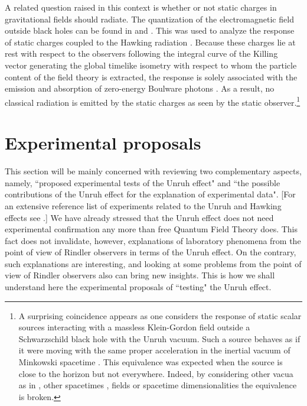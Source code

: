 \documentclass[12pt,nofootinbib,floatfix,aps,prd,showpacs,amsmath,amssymb,eqsecnum]{revtex4-2}
\begin{document}
A related question raised in this context is whether or not static
charges in gravitational fields should radiate. The quantization of the 
electromagnetic field outside black holes can be found 
in \textcite{Cognolaetal98} and \textcite{Crispinoetal01}. This was used to analyze 
the response of static charges coupled to the Hawking radiation
\cite{Crispinoetal98}. Because these charges lie at rest with respect
to the observers following the integral curve of the Killing vector
generating the global timelike isometry with 
respect to whom the particle content of the field theory is extracted,
the response is solely associated with the emission and absorption 
of zero-energy Boulware photons \cite{Boulware75,Boulware75b}. 
As a result, no classical radiation is emitted by the static 
charges as seen by the static observer\cite{Eriksenetal04}.\footnote{ 
A surprising coincidence appears as one considers the response of
static scalar sources interacting with a massless Klein-Gordon field 
outside a Schwarzschild black hole with the Unruh vacuum. Such a source 
behaves as if it were moving with the same proper acceleration in the 
inertial vacuum of Minkowski spacetime \cite{Higuchietal97}. 
This equivalence was expected when the source is close to the 
horizon \cite{Grishchuketal87} but not everywhere. Indeed, by considering 
other vacua \cite{Higuchietal98} as in \textcite{Hartleetal76}, 
other spacetimes \cite{Castineirasetal00}, fields 
\cite{Crispinoetal98,Castineirasetal03} 
or spacetime dimensionalities \cite{Crispinoetal04} 
the equivalence is broken.
                                      }

\section{Experimental proposals}
\label{section:Experimentalproposals}

This section will be mainly concerned with reviewing two complementary aspects, namely,
``proposed experimental tests of the Unruh effect" and ``the possible contributions of 
the Unruh effect for the explanation of experimental data". 
[For an extensive reference 
list of experiments related to the Unruh and Hawking effects 
see \textcite{Rosu01}.] 
We have already stressed that the Unruh effect 
does not need experimental confirmation 
any more than free Quantum Field Theory does. This fact 
does not invalidate, however, 
explanations of laboratory phenomena from the point of view of Rindler observers in 
terms of the Unruh effect. On the contrary, such explanations are 
interesting, and looking at 
some problems from the point of view of Rindler observers also 
can bring new insights.
This is how we shall understand here the experimental proposals of ``testing" the 
Unruh effect.
\end{document}
